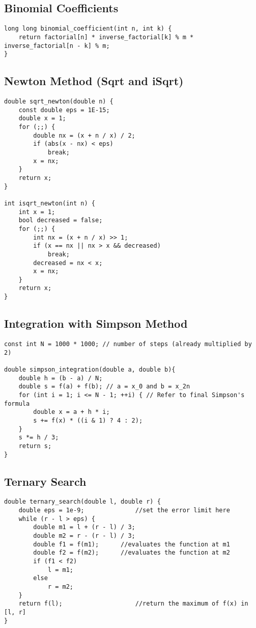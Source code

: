 \documentclass[10pt]{article}
\begin{document}
\begin{multicols*}{2}
\begin{lstlisting}[style=compactcpp]
\end{lstlisting}
\subsection{Binomial Coefficients}
\begin{lstlisting}[style=compactcpp]
long long binomial_coefficient(int n, int k) {
    return factorial[n] * inverse_factorial[k] % m * inverse_factorial[n - k] % m;
}
\end{lstlisting}
\subsection{Newton Method (Sqrt and iSqrt)}
\begin{lstlisting}[style=compactcpp]
double sqrt_newton(double n) {
    const double eps = 1E-15;
    double x = 1;
    for (;;) {
        double nx = (x + n / x) / 2;
        if (abs(x - nx) < eps)
            break;
        x = nx;
    }
    return x;
}

int isqrt_newton(int n) {
    int x = 1;
    bool decreased = false;
    for (;;) {
        int nx = (x + n / x) >> 1;
        if (x == nx || nx > x && decreased)
            break;
        decreased = nx < x;
        x = nx;
    }
    return x;
}
\end{lstlisting}
\subsection{Integration with Simpson Method}
\begin{lstlisting}[style=compactcpp]
const int N = 1000 * 1000; // number of steps (already multiplied by 2)

double simpson_integration(double a, double b){
    double h = (b - a) / N;
    double s = f(a) + f(b); // a = x_0 and b = x_2n
    for (int i = 1; i <= N - 1; ++i) { // Refer to final Simpson's formula
        double x = a + h * i;
        s += f(x) * ((i & 1) ? 4 : 2);
    }
    s *= h / 3;
    return s;
}
\end{lstlisting}
\subsection{Ternary Search}
\begin{lstlisting}[style=compactcpp]
double ternary_search(double l, double r) {
    double eps = 1e-9;              //set the error limit here
    while (r - l > eps) {
        double m1 = l + (r - l) / 3;
        double m2 = r - (r - l) / 3;
        double f1 = f(m1);      //evaluates the function at m1
        double f2 = f(m2);      //evaluates the function at m2
        if (f1 < f2)
            l = m1;
        else
            r = m2;
    }
    return f(l);                    //return the maximum of f(x) in [l, r]
}
\end{lstlisting}

\end{multicols*}
\end{document}
